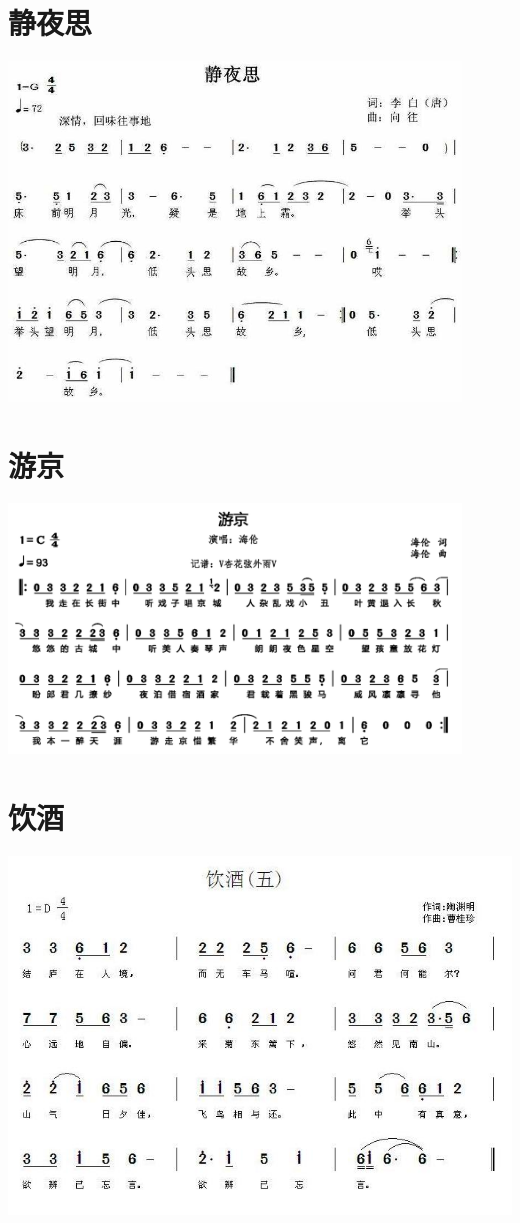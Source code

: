 \documentclass[cn,pad,twocol]{elegantbook}
\begin{document}
\section{静夜思}                \includegraphics[width=0.9\textwidth]{dongxiao/20200411-静夜思}
\section{游京} \includegraphics[width=0.9\textwidth]{macos/2020游京.png}
\section{饮酒}                  \includegraphics[width=\textwidth]{dongxiao/20200808-饮酒-陶渊明.jpg}
\end{document}
